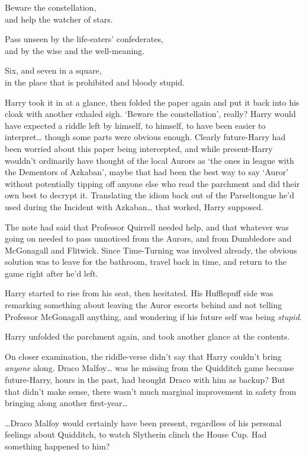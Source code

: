 \begin{writtenNote}
Beware the constellation,\\
and help the watcher of stars.

Pass unseen by the life-eaters' confederates,\\
and by the wise and the well-meaning.

Six, and seven in a square,\\
in the place that is prohibited and bloody stupid.
\end{writtenNote}

Harry took it in at a glance, then folded the paper again and put it back into his cloak with another exhaled sigh. `Beware the constellation', really? Harry would have expected a riddle left by himself, to himself, to have been easier to interpret{\ldots} though some parts were obvious enough. Clearly future-Harry had been worried about this paper being intercepted, and while present-Harry wouldn't ordinarily have thought of the local Aurors as `the ones in league with the Dementors of Azkaban', maybe that had been the best way to say `Auror' without potentially tipping off anyone else who read the parchment and did their own best to decrypt it. Translating the idiom back out of the Parseltongue he'd used during the Incident with Azkaban{\ldots} that worked, Harry supposed.

The note had said that Professor Quirrell needed help, and that whatever was going on needed to pass unnoticed from the Aurors, and from Dumbledore and McGonagall and Flitwick. Since Time-Turning was involved already, the obvious solution was to leave for the bathroom, travel back in time, and return to the game right after he'd left.

Harry started to rise from his seat, then hesitated. His Hufflepuff side was remarking something about leaving the Auror escorts behind and not telling Professor McGonagall anything, and wondering if his future self was being \emph{stupid}.

Harry unfolded the parchment again, and took another glance at the contents.

On closer examination, the riddle-verse didn't say that Harry couldn't bring \emph{anyone} along. Draco Malfoy{\ldots} was he missing from the Quidditch game because future-Harry, hours in the past, had brought Draco with him as backup? But that didn't make sense, there wasn't much marginal improvement in safety from bringing along another first-year{\ldots}

{\ldots}Draco Malfoy would certainly have been present, regardless of his personal feelings about Quidditch, to watch Slytherin clinch the House Cup. Had something happened to him?

